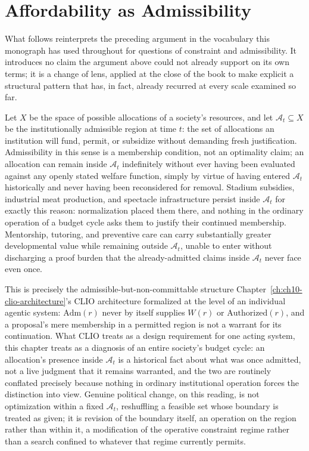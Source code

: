 \section{Affordability as Admissibility}

What follows reinterprets the preceding argument in the vocabulary this monograph has used throughout for questions of constraint and admissibility. It introduces no claim the argument above could not already support on its own terms; it is a change of lens, applied at the close of the book to make explicit a structural pattern that has, in fact, already recurred at every scale examined so far.

Let $X$ be the space of possible allocations of a society's resources, and let $\mathcal{A}_t \subseteq X$ be the institutionally admissible region at time $t$: the set of allocations an institution will fund, permit, or subsidize without demanding fresh justification. Admissibility in this sense is a membership condition, not an optimality claim; an allocation can remain inside $\mathcal{A}_t$ indefinitely without ever having been evaluated against any openly stated welfare function, simply by virtue of having entered $\mathcal{A}_t$ historically and never having been reconsidered for removal. Stadium subsidies, industrial meat production, and spectacle infrastructure persist inside $\mathcal{A}_t$ for exactly this reason: normalization placed them there, and nothing in the ordinary operation of a budget cycle asks them to justify their continued membership. Mentorship, tutoring, and preventive care can carry substantially greater developmental value while remaining outside $\mathcal{A}_t$, unable to enter without discharging a proof burden that the already-admitted claims inside $\mathcal{A}_t$ never face even once.

This is precisely the admissible-but-non-committable structure Chapter~\ref{ch:ch10-clio-architecture}'s CLIO architecture formalized at the level of an individual agentic system: $\mathrm{Adm}(r)$ never by itself supplies $W(r)$ or $\mathrm{Authorized}(r)$, and a proposal's mere membership in a permitted region is not a warrant for its continuation. What CLIO treats as a design requirement for one acting system, this chapter treats as a diagnosis of an entire society's budget cycle: an allocation's presence inside $\mathcal{A}_t$ is a historical fact about what was once admitted, not a live judgment that it remains warranted, and the two are routinely conflated precisely because nothing in ordinary institutional operation forces the distinction into view. Genuine political change, on this reading, is not optimization within a fixed $\mathcal{A}_t$, reshuffling a feasible set whose boundary is treated as given; it is revision of the boundary itself, an operation on the region rather than within it, a modification of the operative constraint regime rather than a search confined to whatever that regime currently permits.

